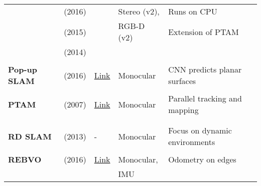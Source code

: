 \documentclass[a4paper,12pt]{scrartcl}
\begin{document}
{\begin{longtable}{l|l|l|l|l}
                           & \cite{Mur-Artal2016a} (2016)      &                                                                    &  Stereo (v2),         & Runs on CPU\\
                           & \cite{Mur-Artal2015} (2015)       &                                                                    &  RGB-D (v2)           & Extension of PTAM\\
                           & \cite{Mur-Artal2014} (2014)       &                                                                    &                       &\\
                           &                                   &                                                                    &                       &\\
    \textbf{Pop-up SLAM}   & \cite{Yang2016} (2016)            & {\href{https://github.com/shichaoy/pop_up_image}{Link}}            & Monocular             & CNN predicts planar surfaces\\
                           &                                   &                                                                    &                       &\\
    \textbf{PTAM}          & \cite{Klein2007} (2007)           & {\href{https://github.com/Oxford-PTAM/PTAM-GPL}{Link}}             & Monocular             & Parallel tracking and mapping\\
                           &                                   &                                                                    &                       &\\
                           &                                   &                                                                    &                       &\\
    \textbf{RD SLAM}       & \cite{Tan2013a} (2013)            & -                                                                  & Monocular             & Focus on dynamic environments\\
                           &                                   &                                                                    &                       &\\
    \textbf{REBVO}         & \cite{Tarrio2016} (2016)          & {\href{https://github.com/JuanTarrio/rebvo}{Link}}                 & Monocular,            & Odometry on edges\\
                           &                                   &                                                                    & IMU                   &\\

\end{longtable}}
\end{document}
